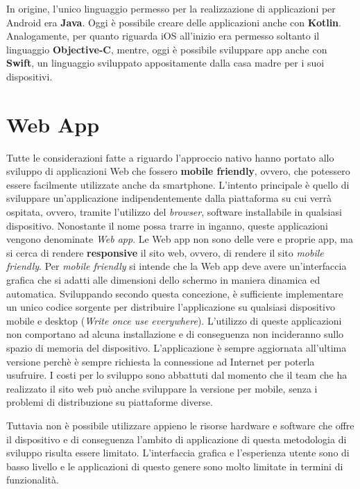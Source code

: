 In origine, l'unico linguaggio permesso per la realizzazione di applicazioni per Android era \textbf{Java}. Oggi è possibile creare delle applicazioni anche con \textbf{Kotlin}. Analogamente, per quanto riguarda iOS all'inizio era permesso soltanto il linguaggio \textbf{Objective-C}, mentre, oggi è possibile sviluppare app anche con \textbf{Swift}, un linguaggio sviluppato appositamente dalla casa madre per i suoi dispositivi.

\section{Web App}
Tutte le considerazioni fatte a riguardo l'approccio nativo hanno portato allo sviluppo di applicazioni Web che fossero \textbf{mobile friendly}, ovvero, che potessero essere facilmente utilizzate anche da smartphone. L'intento principale è quello di sviluppare un'applicazione indipendentemente dalla piattaforma su cui verrà ospitata, ovvero, tramite l'utilizzo del \textit{browser}, software installabile in qualsiasi dispositivo. Nonostante il nome possa trarre in inganno, queste applicazioni vengono denominate \textit{Web app}. Le Web app non sono delle vere e proprie app, ma si cerca di rendere \textbf{responsive} il sito web, ovvero, di rendere il sito \textit{mobile friendly}. Per \textit{mobile friendly} si intende che la Web app deve avere un'interfaccia grafica che si adatti alle dimensioni dello schermo in maniera dinamica ed automatica. Sviluppando secondo questa concezione, è sufficiente implementare un unico codice sorgente per distribuire l'applicazione su qualsiasi dispositivo mobile e desktop (\textit{Write once use everywhere}). L'utilizzo di queste applicazioni non comportano ad alcuna installazione e di conseguenza non incideranno sullo spazio di memoria del dispositivo. L'applicazione è sempre aggiornata all'ultima versione perchè è sempre richiesta la connessione ad Internet per poterla usufruire. I costi per lo sviluppo sono abbattuti dal momento che il team che ha realizzato il sito web può anche sviluppare la versione per mobile, senza i problemi di distribuzione su piattaforme diverse.

Tuttavia non è possibile utilizzare appieno le risorse hardware e software che offre il dispositivo e di conseguenza l'ambito di applicazione di questa metodologia di sviluppo risulta essere limitato. 
L'interfaccia grafica e l'esperienza utente sono di basso livello e le applicazioni di questo genere sono molto limitate in termini di funzionalità.

